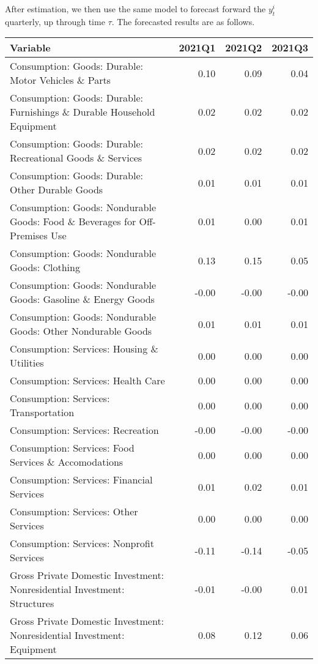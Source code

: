 \documentclass[11pt, letterpaper]{article}\usepackage[]{graphicx}\usepackage[]{color}
\begin{document}
After estimation, we then use the same model to forecast forward the $y^i_t$ quarterly, up through time $\tau$. 
The forecasted results are as follows.
\begin{table}[H]
\centering
\begingroup\scriptsize
\begin{tabular}{lrrr}
  \hline
Variable & 2021Q1 & 2021Q2 & 2021Q3 \\ 
  \hline
Consumption: Goods: Durable: Motor Vehicles \& Parts & 0.10 & 0.09 & 0.04 \\ 
  Consumption: Goods: Durable: Furnishings \& Durable Household Equipment & 0.02 & 0.02 & 0.02 \\ 
  Consumption: Goods: Durable: Recreational Goods \& Services & 0.02 & 0.02 & 0.02 \\ 
  Consumption: Goods: Durable: Other Durable Goods & 0.01 & 0.01 & 0.01 \\ 
  Consumption: Goods: Nondurable Goods: Food \& Beverages for Off-Premises Use & 0.01 & 0.00 & 0.01 \\ 
  Consumption: Goods: Nondurable Goods: Clothing & 0.13 & 0.15 & 0.05 \\ 
  Consumption: Goods: Nondurable Goods: Gasoline \& Energy Goods & -0.00 & -0.00 & -0.00 \\ 
  Consumption: Goods: Nondurable Goods: Other Nondurable Goods & 0.01 & 0.01 & 0.01 \\ 
  Consumption: Services: Housing \& Utilities & 0.00 & 0.00 & 0.00 \\ 
  Consumption: Services: Health Care & 0.00 & 0.00 & 0.00 \\ 
  Consumption: Services: Transportation & 0.00 & 0.00 & 0.00 \\ 
  Consumption: Services: Recreation & -0.00 & -0.00 & -0.00 \\ 
  Consumption: Services: Food Services \& Accomodations & 0.00 & 0.00 & 0.00 \\ 
  Consumption: Services: Financial Services & 0.01 & 0.02 & 0.01 \\ 
  Consumption: Services: Other Services & 0.00 & 0.00 & 0.00 \\ 
  Consumption: Services: Nonprofit Services & -0.11 & -0.14 & -0.05 \\ 
  Gross Private Domestic Investment: Nonresidential Investment: Structures & -0.01 & -0.00 & 0.01 \\ 
  Gross Private Domestic Investment: Nonresidential Investment: Equipment & 0.08 & 0.12 & 0.06 \\ 

\end{tabular}
\end{table}
\end{document}
